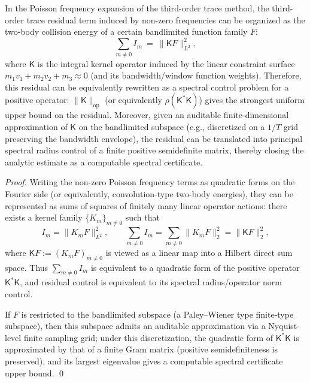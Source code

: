 \begin{proposition}\label{prop:gm-trace3-poisson-collision-energy}
In the Poisson frequency expansion of the third-order trace method, the third-order trace residual term induced by non-zero frequencies can be organized as the two-body collision energy of a certain bandlimited function family \(F\):
\[
\sum_{m\ne 0} I_m\ =\ \|\mathsf{K}F\|_{L^2}^2,
\]
where \(\mathsf{K}\) is the integral kernel operator induced by the linear constraint surface \(m_1v_1+m_2v_2+m_3\approx 0\) (and its bandwidth/window function weights).
Therefore, this residual can be equivalently rewritten as a spectral control problem for a positive operator: \(\|\mathsf{K}\|_{\mathrm{op}}\) (or equivalently \(\rho(\mathsf{K}^\ast\mathsf{K})\)) gives the strongest uniform upper bound on the residual.
Moreover, given an auditable finite-dimensional approximation of \(\mathsf{K}\) on the bandlimited subspace (e.g., discretized on a \(1/T\) grid preserving the bandwidth envelope), the residual can be translated into principal spectral radius control of a finite positive semidefinite matrix, thereby closing the analytic estimate as a computable spectral certificate.
\end{proposition}

\begin{proof}
Writing the non-zero Poisson frequency terms as quadratic forms on the Fourier side (or equivalently, convolution-type two-body energies), they can be represented as sums of squares of finitely many linear operator actions:
there exists a kernel family \(\{K_m\}_{m\ne 0}\) such that
\[
I_m=\|K_m F\|_{L^2}^2,\qquad \sum_{m\ne 0}I_m=\sum_{m\ne 0}\|K_mF\|_2^2=\|\mathsf{K}F\|_2^2,
\]
where \(\mathsf{K}F:=(K_mF)_{m\ne 0}\) is viewed as a linear map into a Hilbert direct sum space.
Thus \(\sum_{m\ne 0} I_m\) is equivalent to a quadratic form of the positive operator \(\mathsf{K}^\ast\mathsf{K}\), and residual control is equivalent to its spectral radius/operator norm control.

If \(F\) is restricted to the bandlimited subspace (a Paley--Wiener type finite-type subspace), then this subspace admits an auditable approximation via a Nyquist-level finite sampling grid; under this discretization, the quadratic form of \(\mathsf{K}^\ast\mathsf{K}\) is approximated by that of a finite Gram matrix (positive semidefiniteness is preserved), and its largest eigenvalue gives a computable spectral certificate upper bound. \qed
\end{proof}

